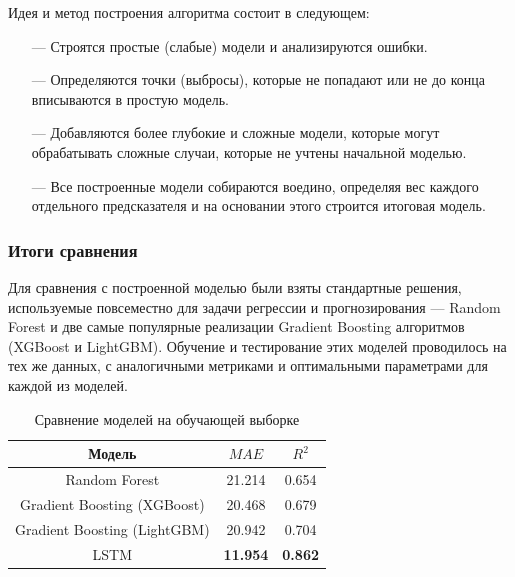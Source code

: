 \documentclass[14pt]{extarticle}
\begin{document}
Идея и метод построения алгоритма состоит в следующем:

\begin{itemize}
	\linespread{2}
	\item[---] Строятся простые (слабые) модели и анализируются ошибки.
	\item[---] Определяются точки (выбросы), которые не попадают или не до конца вписываются в простую модель.
	\item[---] Добавляются более глубокие и сложные модели, которые могут обрабатывать сложные случаи, которые не учтены начальной моделью.
	\item[---] Все построенные модели собираются воедино, определяя вес каждого отдельного предсказателя и на основании этого строится итоговая модель.
\end{itemize}

\subsubsection{Итоги сравнения}

Для сравнения с построенной моделью были взяты стандартные решения, используемые повсеместно для задачи регрессии и прогнозирования --- Random Forest и две самые популярные реализации Gradient Boosting алгоритмов (XGBoost и LightGBM). Обучение и тестирование этих моделей проводилось на тех же данных, с аналогичными метриками и оптимальными параметрами для каждой из моделей.

\begin{center}
	\begin{table}[h]
		\centering
		\begin{tabular}{ccc}
			\hline Модель & $MAE$ &  $R^2$ \\
			\hline Random Forest & 21.214  & 0.654\\
			Gradient Boosting (XGBoost)  & 20.468 & 0.679 \\
			Gradient Boosting (LightGBM)  & 20.942 & 0.704 \\
			LSTM & {\bf 11.954}  & {\bf 0.862}\\
			\hline 
		\end{tabular}
		\caption{Сравнение моделей на обучающей выборке}
		\label{Tab:results1}
	\end{table}
\end{center}
\end{document}
